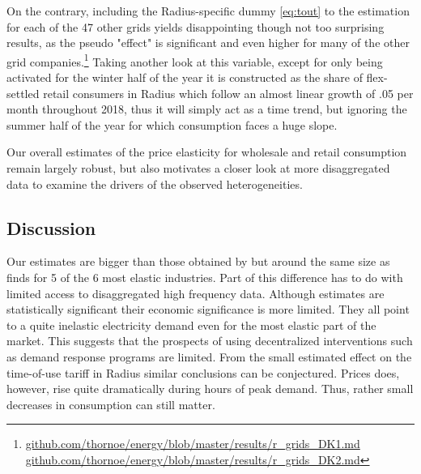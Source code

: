 \par
On the contrary, including the Radius-specific dummy \eqref{eq:tout} to the estimation for each of the 47 other grids yields disappointing though not too surprising results, as the pseudo "effect" is significant and even higher for many of the other grid companies.\footnote{\href{https://github.com/thornoe/energy/blob/master/results/r_grids_DK1.md}{github.com/thornoe/energy/blob/master/results/r\_grids\_DK1.md}\\\href{https://github.com/thornoe/energy/blob/master/results/r_grids_DK2.md}{github.com/thornoe/energy/blob/master/results/r\_grids\_DK2.md}} Taking another look at this variable, except for only being activated for the winter half of the year it is constructed as the share of flex-settled retail consumers in Radius which follow an almost linear growth of .05 per month throughout 2018, thus it will simply act as a time trend, but ignoring the summer half of the year for which consumption faces a huge slope.
\bigskip\par
Our overall estimates of the price elasticity for wholesale and retail consumption remain largely robust, but also motivates a closer look at more disaggregated data to examine the drivers of the observed heterogeneities.
\par

\subsection{Discussion}
\label{subsec:r_discussion}
Our estimates are bigger than those obtained by \citet{lijesen2007real} but around the same size as \citet{wolak2001impact} finds for 5 of the 6 most elastic industries. Part of this difference has to do with limited access to disaggregated high frequency data. Although estimates are statistically significant their economic significance is more limited. They all point to a quite inelastic electricity demand even for the most elastic part of the market. This suggests that the prospects of using decentralized interventions such as demand response programs are limited. From the small estimated effect on the time-of-use tariff in Radius similar conclusions can be conjectured. Prices does, however, rise quite dramatically during hours of peak demand. Thus, rather small decreases in consumption can still matter. %
\bigskip

